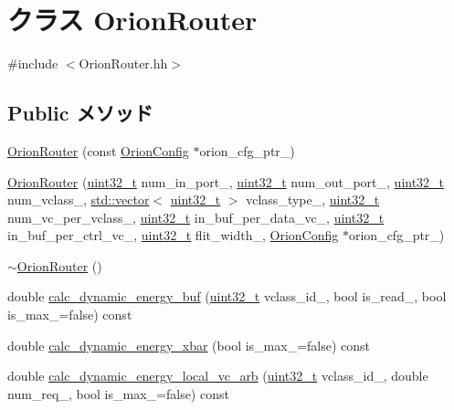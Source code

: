 \hypertarget{classOrionRouter}{
\section{クラス OrionRouter}
\label{classOrionRouter}
}


{\ttfamily \#include $<$OrionRouter.hh$>$}\subsection*{Public メソッド}
\begin{DoxyCompactItemize}
\item 
\hyperlink{classOrionRouter_ade6899492dcf98912796433be31cda45}{OrionRouter} (const \hyperlink{classOrionConfig}{OrionConfig} $\ast$orion\_\-cfg\_\-ptr\_\-)
\item 
\hyperlink{classOrionRouter_ab4af4a1367755035f28a30cc3ca2e15c}{OrionRouter} (\hyperlink{Type_8hh_a435d1572bf3f880d55459d9805097f62}{uint32\_\-t} num\_\-in\_\-port\_\-, \hyperlink{Type_8hh_a435d1572bf3f880d55459d9805097f62}{uint32\_\-t} num\_\-out\_\-port\_\-, \hyperlink{Type_8hh_a435d1572bf3f880d55459d9805097f62}{uint32\_\-t} num\_\-vclass\_\-, \hyperlink{classstd_1_1vector}{std::vector}$<$ \hyperlink{Type_8hh_a435d1572bf3f880d55459d9805097f62}{uint32\_\-t} $>$ vclass\_\-type\_\-, \hyperlink{Type_8hh_a435d1572bf3f880d55459d9805097f62}{uint32\_\-t} num\_\-vc\_\-per\_\-vclass\_\-, \hyperlink{Type_8hh_a435d1572bf3f880d55459d9805097f62}{uint32\_\-t} in\_\-buf\_\-per\_\-data\_\-vc\_\-, \hyperlink{Type_8hh_a435d1572bf3f880d55459d9805097f62}{uint32\_\-t} in\_\-buf\_\-per\_\-ctrl\_\-vc\_\-, \hyperlink{Type_8hh_a435d1572bf3f880d55459d9805097f62}{uint32\_\-t} flit\_\-width\_\-, \hyperlink{classOrionConfig}{OrionConfig} $\ast$orion\_\-cfg\_\-ptr\_\-)
\item 
\hyperlink{classOrionRouter_a72b1eb77cfa9164b0d26fddbf92e9de7}{$\sim$OrionRouter} ()
\item 
double \hyperlink{classOrionRouter_a7e8fa7ff5c7148124c248a5597fa354e}{calc\_\-dynamic\_\-energy\_\-buf} (\hyperlink{Type_8hh_a435d1572bf3f880d55459d9805097f62}{uint32\_\-t} vclass\_\-id\_\-, bool is\_\-read\_\-, bool is\_\-max\_\-=false) const 
\item 
double \hyperlink{classOrionRouter_a2981899f6e58668a49ad442d901f435b}{calc\_\-dynamic\_\-energy\_\-xbar} (bool is\_\-max\_\-=false) const 
\item 
double \hyperlink{classOrionRouter_ac8e3af98710aab6e2e13eef8facd648e}{calc\_\-dynamic\_\-energy\_\-local\_\-vc\_\-arb} (\hyperlink{Type_8hh_a435d1572bf3f880d55459d9805097f62}{uint32\_\-t} vclass\_\-id\_\-, double num\_\-req\_\-, bool is\_\-max\_\-=false) const 

\end{DoxyCompactItemize}
